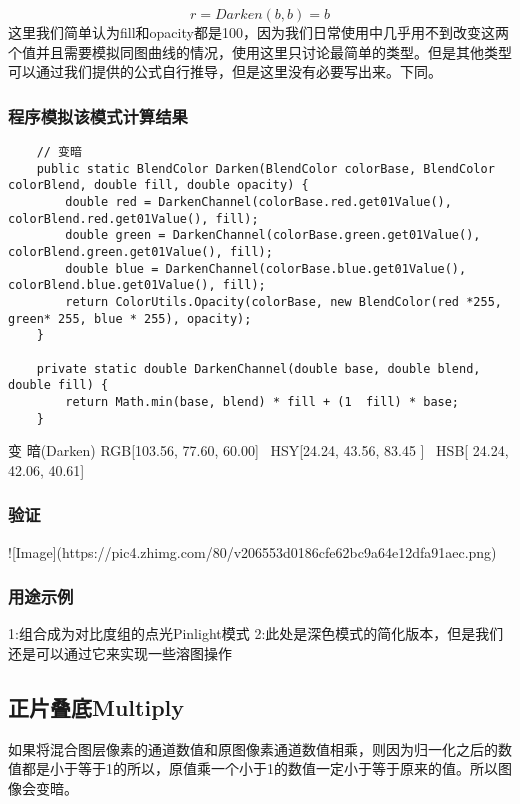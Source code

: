 $$r=Darken(b,b)=b$$
这里我们简单认为fill和opacity都是100，因为我们日常使用中几乎用不到改变这两个值并且需要模拟同图曲线的情况，使用这里只讨论最简单的类型。但是其他类型可以通过我们提供的公式自行推导，但是这里没有必要写出来。下同。

\subsubsection{ 程序模拟该模式计算结果}

\begin{lstlisting}
	// 变暗
	public static BlendColor Darken(BlendColor colorBase, BlendColor colorBlend, double fill, double opacity) {
		double red = DarkenChannel(colorBase.red.get01Value(), colorBlend.red.get01Value(), fill);
		double green = DarkenChannel(colorBase.green.get01Value(), colorBlend.green.get01Value(), fill);
		double blue = DarkenChannel(colorBase.blue.get01Value(), colorBlend.blue.get01Value(), fill);
		return ColorUtils.Opacity(colorBase, new BlendColor(red *255, green* 255, blue * 255), opacity);
	}
	
	private static double DarkenChannel(double base, double blend, double fill) {
		return Math.min(base, blend) * fill + (1  fill) * base;
	}
\end{lstlisting}



变    暗(Darken)        RGB[103.56,  77.60,  60.00]~ HSY[24.24,  43.56,  83.45 ]~ HSB[ 24.24,  42.06,  40.61]


\subsubsection{ 验证}
![Image](https://pic4.zhimg.com/80/v206553d0186cfe62bc9a64e12dfa91aec.png)

\subsubsection{ 用途示例}

1:组合成为对比度组的点光Pinlight模式
2:此处是深色模式的简化版本，但是我们还是可以通过它来实现一些溶图操作

\subsection{ 正片叠底Multiply}

如果将混合图层像素的通道数值和原图像素通道数值相乘，则因为归一化之后的数值都是小于等于1的所以，原值乘一个小于1的数值一定小于等于原来的值。所以图像会变暗。

